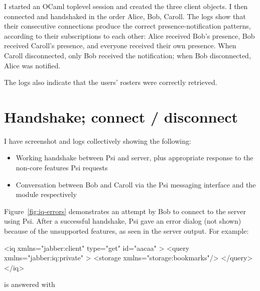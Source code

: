 \documentclass[12pt,a4paper,twoside,openright]{report}
\begin{document}
{\begin{figure}
\end{figure}

I started an OCaml toplevel session and created the three client objects. I then connected and handshaked in the order Alice, Bob, Caroll.
The logs show that their consecutive connections produce the correct presence-notification patterns, according to their subscriptions to each other: Alice received Bob's presence, Bob received Caroll's presence, and everyone received their own presence. When Caroll disconnected, only Bob received the notification; when Bob disconnected, Alice was notified.

The logs also indicate that the users' rosters were correctly retrieved.

\section{Handshake; connect / disconnect}
I have screenshot and logs collectively showing the following:
\begin{itemize}
  \item Working handshake between Psi and server, plus appropriate  response to the non-core features Psi requests
  \item Conversation between Bob and Caroll via the Psi messaging interface and the  module respectively
\end{itemize}
Figure~\ref{fig:iq-errors} demonstrates an attempt by Bob to connect to the server using Psi. After a successful handshake, Psi gave an error dialog (not shown) because of the unsupported features, as seen in the server output. For example:

\begin{xml}
<iq xmlns="jabber:client" type="get" id="aacaa" >
  <query xmlns="jabber:iq:private" >
   <storage xmlns="storage:bookmarks"/>
  </query>
</iq>
\end{xml}

is answered with

}
\end{document}
